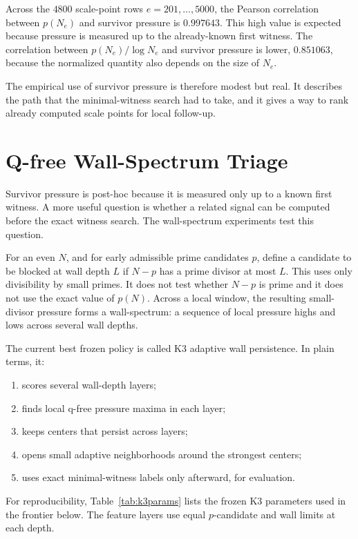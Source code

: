 \documentclass[11pt]{article}
\begin{document}
Across the \(4800\) scale-point rows \(e=201,\ldots,5000\), the Pearson
correlation between \(p(N_e)\) and survivor pressure is \(0.997643\). This high
value is expected because pressure is measured up to the already-known first
witness. The correlation between \(p(N_e)/\log N_e\) and survivor pressure is
lower, \(0.851063\), because the normalized quantity also depends on the size
of \(N_e\).

The empirical use of survivor pressure is therefore modest but real. It
describes the path that the minimal-witness search had to take, and it gives a
way to rank already computed scale points for local follow-up.

\section{Q-free Wall-Spectrum Triage}

Survivor pressure is post-hoc because it is measured only up to a known first
witness. A more useful question is whether a related signal can be computed
before the exact witness search. The wall-spectrum experiments test this
question.

For an even \(N\), and for early admissible prime candidates \(p\), define a
candidate to be blocked at wall depth \(L\) if \(N-p\) has a prime divisor
at most \(L\). This uses only divisibility by small primes. It does not test
whether \(N-p\) is prime and it does not use the exact value of \(p(N)\).
Across a local window, the resulting small-divisor pressure forms a
wall-spectrum: a sequence of local pressure highs and lows across several
wall depths.

The current best frozen policy is called K3 adaptive wall persistence. In
plain terms, it:
\begin{enumerate}
\item scores several wall-depth layers;
\item finds local q-free pressure maxima in each layer;
\item keeps centers that persist across layers;
\item opens small adaptive neighborhoods around the strongest centers;
\item uses exact minimal-witness labels only afterward, for evaluation.
\end{enumerate}

For reproducibility, Table~\ref{tab:k3params} lists the frozen K3 parameters
used in the frontier below. The feature layers use equal \(p\)-candidate and
wall limits at each depth.
\end{document}
